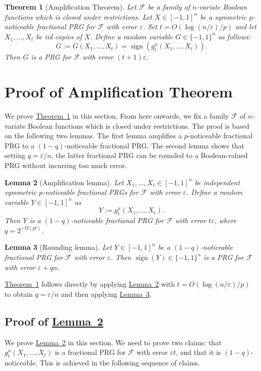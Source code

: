\documentclass[11pt]{article}
\numberwithin{equation}{section}
\newtheorem{theorem}{Theorem}[section]
\newtheorem{lemma}[theorem]{Lemma}
\theoremstyle{definition}
\theoremstyle{plain}
\newcommand{\expref}[2]{\hyperref[#2]{#1~\ref{#2}}}
\newcommand{\FF}{\mathcal{F}}
\newcommand{\eps}{\varepsilon}
\DeclareMathOperator{\sign}{sign}     %
\begin{document}
\begin{theorem}[Amplification Theorem]
\label{thm:main}
Let $\FF$ be a family of $n$-variate Boolean functions which is closed under restrictions.
Let $X \in [-1,1]^n$ be a symmetric $p$-noticeable fractional PRG for $\FF$ with error $\eps$. Set $t=O(\log(n/\eps)/p)$ and let $X_1,\ldots,X_t$
be iid copies of $X$. Define a random variable $G \in \{-1,1\}^n$ as follows:
$$
G:=G(X_1,\ldots,X_t) = \sign(g_t^n(X_1,\ldots,X_t)).
$$
Then $G$ is a PRG for $\FF$ with error $(t+1)\eps$.
\end{theorem}




\section{Proof of Amplification Theorem}
\label{sec:proof_main}
We prove \expref{Theorem}{thm:main} in this section. {}From here onwards, we fix a family $\FF$ of $n$-variate Boolean functions which is closed under restrictions.
The proof is based on the following two lemmas.
The first lemma amplifies a $p$-noticeable fractional PRG to a $(1-q)$-noticeable fractional PRG\@. The second
lemma shows that setting $q=\eps/n$, the latter fractional PRG can be rounded to a Boolean-valued PRG without incurring
too much error.

\begin{lemma}[Amplification lemma]
\label{lemma:amplify}
Let $X_1,\ldots,X_t \in [-1,1]^n$ be independent symmetric $p$-noticeable fractional PRGs for $\FF$ with error $\eps$.
Define a random variable $Y \in [-1,1]^n$ as
$$
Y:=g_t^n(X_1,\ldots,X_t).
$$
Then $Y$ is a $(1-q)$-noticeable fractional PRG for $\FF$ with error $t\eps$, where $q=2^{-\Omega(pt)}$.
\end{lemma}

\begin{lemma}[Rounding lemma]
\label{lemma:round}
Let $Y \in [-1,1]^n$ be a $(1-q)$-noticeable fractional PRG for $\FF$ with error $\eps$.
Then $\sign(Y) \in \{-1,1\}^n$ is a PRG for $\FF$ with error $\eps+qn$.
\end{lemma}

\expref{Theorem}{thm:main} follows directly by applying \expref{Lemma}{lemma:amplify} with $t=O(\log(n/\eps)/p)$ to obtain
$q=\eps/n$ and then applying \expref{Lemma}{lemma:round}.

\subsection{Proof of \expref{Lemma}{lemma:amplify}}
We prove \expref{Lemma}{lemma:amplify} in this section. We need to prove two claims: that $g_t^n(X_1,\ldots,X_t)$ is a fractional
PRG for $\FF$ with error $\eps t$, and that it is $(1-q)$-noticeable. This is achieved in the following sequence of claims.
\end{document}

